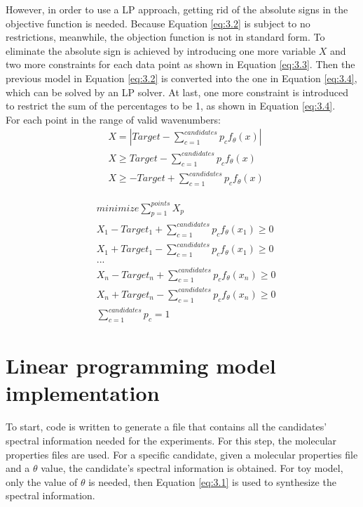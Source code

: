 However, in order to use a LP approach, getting rid of the absolute signs in the objective function is needed. Because Equation \ref{eq:3.2} is subject to no restrictions, meanwhile, the objection function is not in standard form. To eliminate the absolute sign is achieved by introducing one more variable $X$ and two more constraints for each data point as shown in Equation \ref{eq:3.3}. Then the previous model in Equation \ref{eq:3.2} is converted into the one in Equation \ref{eq:3.4}, which can be solved by an LP solver. At last, one more constraint is introduced to restrict the sum of the percentages to be 1, as shown in Equation \ref{eq:3.4}. \\

For each point in the range of valid wavenumbers:
\begin{eqnarray} \label{eq:3.3}
& X = \left| Target-\displaystyle\sum^{candidates}_{c=1}p_{c}f_{\theta}(x) \right| \nonumber \\
&  X \geq Target-\displaystyle\sum^{candidates}_{c=1}p_{c}f_{\theta}(x)   \nonumber \\
& X \geq -Target+\displaystyle\sum^{candidates}_{c=1}p_{c}f_{\theta}(x)  
\end{eqnarray} 

\begin{eqnarray} \label{eq:3.4}
& minimize \displaystyle\sum^{points}_{p=1} X_p \nonumber \\
& X_1 - Target_1 + \displaystyle\sum^{candidates}_{c=1}p_{c}f_{\theta}(x_1) \geq 0 \nonumber \\
& X_1 + Target_1 - \displaystyle\sum^{candidates}_{c=1}p_{c}f_{\theta}(x_1) \geq 0 \nonumber \\
& ... \nonumber \\
& X_n - Target_n + \displaystyle\sum^{candidates}_{c=1}p_{c}f_{\theta}(x_n) \geq 0 \nonumber \\
& X_n + Target_n - \displaystyle\sum^{candidates}_{c=1}p_{c}f_{\theta}(x_n) \geq 0 \nonumber \\
& \displaystyle\sum^{candidates}_{c=1}p_{c} = 1 
\end{eqnarray} 

\section{Linear programming model implementation}
To start, code is written to generate a file that contains all the candidates' spectral information needed for the experiments. For this step, the molecular properties files are used. For a specific candidate, given a molecular properties file and a $\theta$ value, the candidate's spectral information is obtained. For toy model, only the value of $\theta$ is needed, then Equation \ref{eq:3.1} is used to synthesize the spectral information. \\

